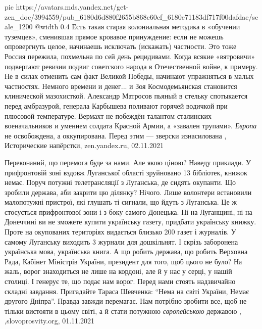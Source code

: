 \ifcmt
  pic https://avatars.mds.yandex.net/get-zen_doc/3994559/pub_6180d6d880f2655b868c60cf_6180e71183df717f00dafdae/scale_1200
  @width 0.4
\fi
Есть такая старая колониальная методика в «обучении туземцев», сменившая прямое
кровавое принуждение: если не можешь опровергнуть целое, начинаешь исключать
(искажать) частности. Это тоже Россия пережила, похмельна по сей день
рецидивами. Когда всякие «вятровичи» подвергают ревизии подвиг советского
народа в Отечественной войне, к примеру.  Не в силах отменить сам факт Великой
Победы, начинают упражняться в малых частностях. Немного времени и денег... и
Зоя Космодемьянская становится клинической мазохисткой. Александр Матросов
пьяный в стельку спотыкается перед амбразурой, генерала Карбышева поливают
горячей водичкой при плюсовой температуре. Вермахт не побеждён талантом
сталинских военачальников и умением солдата Красной Армии, а «завален трупами».
\emph{Европа} не освобождена, а оккупирована. Перед этим — зверски изнасилована
, 
Исторические напёрстки, zen.yandex.ru, 02.11.2021

Переконаний, що перемога буде за нами. Але якою ціною? Наведу приклади. У
прифронтовій зоні вздовж Луганської області зруйновано 13 бібліотек, книжок
немає. Поруч потужні телетрансляції з Луганська, де сидять окупанти. Що зробили
держава, аби закрити цю ділянку? Нічого. Лише волонтери встановили малопотужні
пристрої, які глушать ті сигнали, що йдуть з Луганська. Це ж стосується
прифронтової зони і з боку самого Донецька.  Ні на Луганщині, ні на Донеччині
ви не зможете купити українську газету, придбати українську книжку. Проте на
окупованих територіях видається близько 200 газет і журналів. У самому
Луганську виходить 3 журнали для дошкільнят. І скрізь заборонена українська
мова, українська книга.  А що робить держава, що робить Верховна Рада, Кабінет
Міністрів України, президент для того, щоб цього не було? На жаль, ворог
знаходиться не лише на кордоні, але й у нас у серці, у нашій столиці. І генерує
те, що подає нам ворог.  Перед нами стоять надзвичайно складні завдання.
Пригадайте Тараса Шевченка: \enquote{Нема на світі України, Немає другого Дніпра}.
Правда завжди перемагає. Нам потрібно зробити все, щоб не тільки вистояти в
цьому світі, а й стати потужною \emph{європейською} державою
, ,slovoprosvity.org, 01.11.2021
